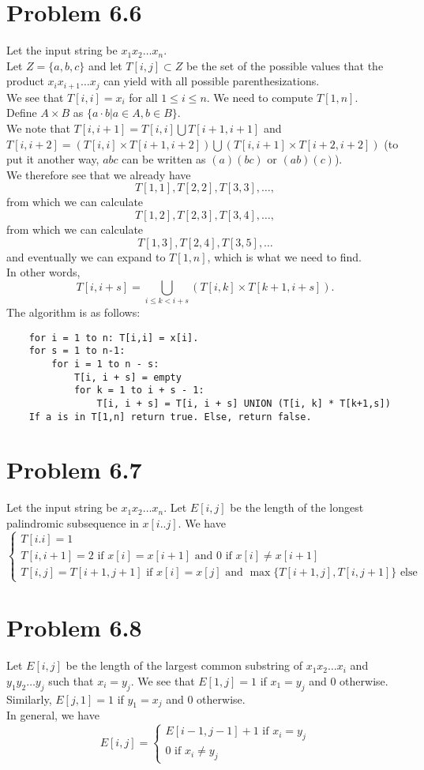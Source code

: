 \documentclass[12pt]{article}
\begin{document}
\section{Problem 6.6}
Let the input string be $x_1 x_2 \ldots x_n$. \\
Let $Z = \{a,b,c\}$ and let $T[i,j] \subset Z$ be the set of the possible values that the product $x_i x_{i+1} \ldots x_{j}$ can yield with all possible parenthesizations. \\
We see that $T[i,i] = x_i$ for all $1 \le i \le n$. We need to compute $T[1,n]$. \\
Define $A \times B$ as $\{ a \cdot b | a \in A, b \in B\}$. \\
We note that $T[i, i+1] = T[i,i] \bigcup T[i+1, i+1]$ and $T[i,i+2] = (T[i,i] \times T[i+1, i+2]) \bigcup (T[i,i+1] \times T[i+2,i+2])$ (to put it another way, $abc$ can be written as $(a)(bc)$ or $(ab)(c)$). \\
We therefore see that we already have $$T[1,1], T[2,2], T[3,3], \ldots,$$
from which we can calculate $$T[1,2], T[2,3], T[3,4], \ldots,$$
from which we can calculate $$T[1,3], T[2,4], T[3,5], \ldots $$
and eventually we can expand to $T[1,n]$, which is what we need to find.\\
In other words, $$T[i, i + s] = \bigcup_{i \le k < i + s} (T[i,k] \times T[k+1, i + s]).$$
The algorithm is as follows:
\begin{lstlisting}
	for i = 1 to n: T[i,i] = x[i].
	for s = 1 to n-1:
		for i = 1 to n - s:
			T[i, i + s] = empty
			for k = 1 to i + s - 1:
				T[i, i + s] = T[i, i + s] UNION (T[i, k] * T[k+1,s])
	If a is in T[1,n] return true. Else, return false.
\end{lstlisting}

\section{Problem 6.7}
Let the input string be $x_1 x_2 \ldots x_n$. Let $E[i,j]$ be the length of the longest palindromic subsequence in $x[i..j]$. We have $$\begin{cases} T[i.i] = 1 \\ T[i,i+1] = 2 \text{ if } x[i] = x[i+1] \text{ and } 0 \text{ if } x[i] \ne x[i+1] \\ T[i,j] = T[i+1,j+1] \text{ if } x[i] = x[j] \text{ and } \max \{T[i+1,j], T[i,j+1]\} \text{ else} \end{cases}$$

\section{Problem 6.8}
Let $E[i,j]$ be the length of the largest common substring of $x_1 x_2 \ldots x_i$ and $y_1 y_2 \ldots y_j$ such that $x_i = y_j$. We see that $E[1,j] = 1$ if $x_1 = y_j$ and $0$ otherwise. Similarly, $E[j,1] = 1$ if $y_1 = x_j$ and $0$ otherwise.\\
In general, we have $$E[i,j] = \begin{cases} E[i-1,j-1] + 1 \text{ if } x_i = y_j \\ 0 \text{ if } x_i \ne y_j \end{cases}$$
\end{document}
